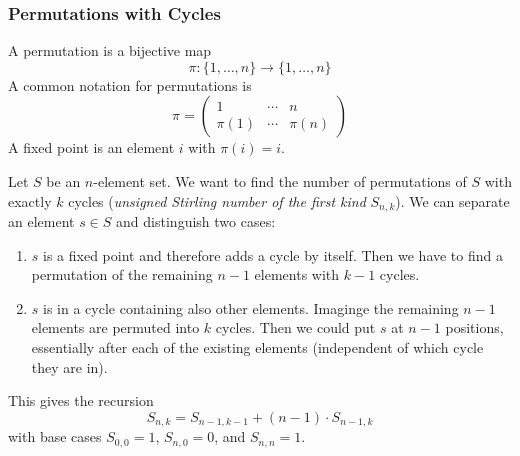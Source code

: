 \subsubsection{Permutations with Cycles}
\label{subsubsec:permutations}
A permutation is a bijective map
\[
  \pi: \{1,\ldots,n\} \to \{1,\ldots,n\}
\]
A common notation for permutations is 
\[
  \pi=\begin{pmatrix}
    1&\cdots&n\\
    \pi(1)&\cdots&\pi(n)
  \end{pmatrix}
\]
A fixed point is an element \(i\) with \(\pi(i)=i\).

Let \(S\) be an \(n\)-element set. 
We want to find the number of permutations of \(S\) with exactly \(k\) cycles (\emph{unsigned Stirling number of the first kind} \(S_{n,k}\)).
We can separate an element \(s\in S\) and distinguish two cases:
\begin{enumerate}
\item \(s\) is a fixed point and therefore adds a cycle by itself.
Then we have to find a permutation of the remaining \(n-1\) elements with \(k-1\) cycles.
\label{case:permutations:own-cycle}
\item \(s\) is in a cycle containing also other elements.
Imaginge the remaining \(n-1\) elements are permuted into \(k\) cycles.
Then we could put \(s\) at \(n-1\) positions, essentially after each of the existing elements (independent of which cycle they are in).
\label{case:permutations:with-other-elements}
\end{enumerate}
This gives the recursion
\begin{equation}\label{eq:stirling-first}
  S_{n,k}
  =
  S_{n-1,k-1}
  + 
  (n-1) \cdot S_{n-1,k}
\end{equation}
with base cases \(S_{0,0}=1\), \(S_{n,0}=0\), and \(S_{n,n}=1\).








